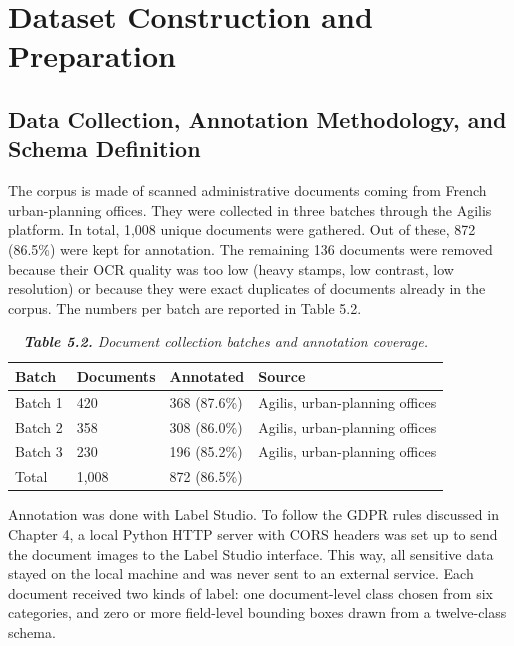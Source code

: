 \section{Dataset Construction and Preparation}

\subsection{Data Collection, Annotation Methodology, and Schema Definition}

The corpus is made of scanned administrative documents coming from French urban-planning offices. They were collected in three batches through the Agilis platform. In total, 1,008 unique documents were gathered. Out of these, 872 (86.5\%) were kept for annotation. The remaining 136 documents were removed because their OCR quality was too low (heavy stamps, low contrast, low resolution) or because they were exact duplicates of documents already in the corpus. The numbers per batch are reported in Table 5.2.

\begin{table}[H]
  \centering
  \caption{\textit{\textbf{Table 5.2.} Document collection batches and annotation coverage.}}
  \renewcommand{\arraystretch}{1.0}
  \footnotesize
  \begin{tabularx}{\textwidth}{|>{\raggedright\arraybackslash}p{2.3cm}|X|X|X|}
    \hline
    \textbf{Batch} & \textbf{Documents} & \textbf{Annotated} & \textbf{Source} \\ \hline
    Batch 1 & 420 & 368 (87.6\%) & Agilis, urban-planning offices \\ \hline
    Batch 2 & 358 & 308 (86.0\%) & Agilis, urban-planning offices \\ \hline
    Batch 3 & 230 & 196 (85.2\%) & Agilis, urban-planning offices \\ \hline
    Total & 1,008 & 872 (86.5\%) &  \\ \hline
  \end{tabularx}
\end{table}

Annotation was done with Label Studio. To follow the GDPR rules discussed in Chapter 4, a local Python HTTP server with CORS headers was set up to send the document images to the Label Studio interface. This way, all sensitive data stayed on the local machine and was never sent to an external service. Each document received two kinds of label: one document-level class chosen from six categories, and zero or more field-level bounding boxes drawn from a twelve-class schema.

